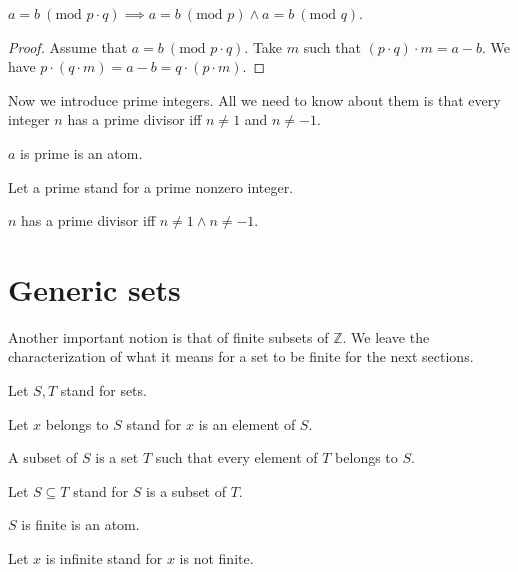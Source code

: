 \documentclass{article}
\renewcommand{\mod}{\text{mod }}
\newcommand{\Int}{\mathbb{Z}}
\begin{document}
\begin{forthel}
    \begin{lemma}[EquModMul]
      $a = b ~(\mod p \cdot q) \implies a = b ~(\mod p) \wedge a = b ~(\mod q)$.
    \end{lemma}
    \begin{proof}
      Assume that $a = b ~(\mod p \cdot q)$. Take $m$ such that $(p \cdot q) \cdot m = a - b$. We have $p \cdot (q \cdot m) = a - b = q \cdot (p \cdot m)$.
    \end{proof}
  \end{forthel}

  Now we introduce prime integers. All we need to know about them is that every integer $n$ has a prime divisor iff $n \neq 1$ and $n \neq -1$.

  \begin{forthel}
    \begin{signature}[Prime]
      $a$ is prime is an atom.
    \end{signature}

    Let a prime stand for a prime nonzero integer.

    \begin{axiom}[PrimeDivisor]
      $n$ has a prime divisor iff $n \neq 1 \wedge n \neq -1$.
    \end{axiom}
  \end{forthel}


  \section{Generic sets}

  Another important notion is that of finite subsets of $\Int$. We leave the characterization of what it means for a set to be finite for the next sections.

  \begin{forthel}

    Let $S,T$ stand for sets.

    Let $x$ belongs to $S$ stand for $x$ is an element of $S$.

    \begin{definition}[Subset]
      A subset of $S$ is a set $T$ such that every element of $T$ belongs to $S$.
    \end{definition}

    Let $S \subseteq T$ stand for $S$ is a subset of $T$.

    \begin{signature}[FinSet]
      $S$ is finite is an atom.
    \end{signature}

    Let $x$ is infinite stand for $x$ is not finite.
  \end{forthel}
\end{document}
